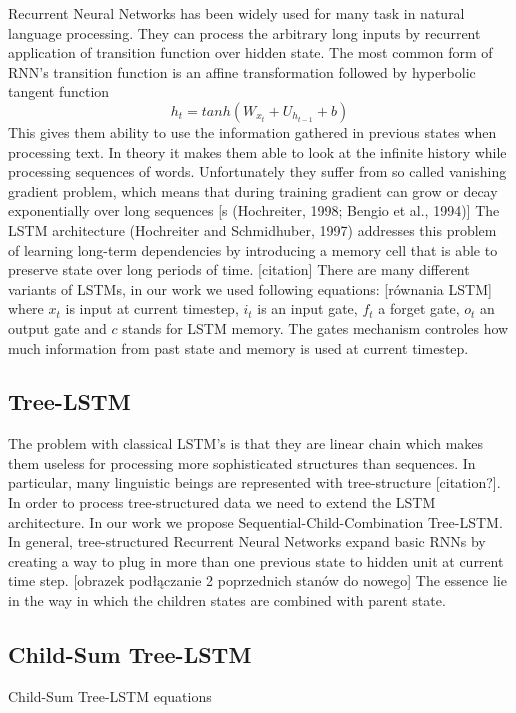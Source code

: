 \documentclass[10pt, a4paper]{article}
\begin{document}
Recurrent Neural Networks has been widely used for many task in natural language processing. They can process the arbitrary long inputs by recurrent application of transition function over hidden state. 
	The most common form of RNN's transition function is an affine transformation followed by hyperbolic tangent function
	\begin{equation} h_t = tanh(W_{x_t}+U_{h_{t-1}}+b)
\end{equation}
	  	This gives them ability to use the information gathered in previous states when processing text. In theory it makes them able to look at the infinite history while processing sequences of words. 	Unfortunately they suffer from so called vanishing gradient problem, which means that during training gradient can grow or decay exponentially over long sequences [s (Hochreiter,
1998; Bengio et al., 1994)]
	The LSTM architecture (Hochreiter and Schmidhuber, 1997) addresses this problem of learning long-term dependencies by introducing a memory cell that is able to preserve state over long periods of time. [citation]
		There are many different variants of LSTMs, in our work we used following equations:
		[równania LSTM]		
		where $x_t$ is input at current timestep, $i_t$ is an input gate, $f_t$ a forget gate, $o_t$ an output gate and $c$ stands for LSTM memory.
		The gates mechanism controles how much information from past state and memory is used at current timestep. 

\subsection{Tree-LSTM}
	The problem with classical LSTM's is that they are linear chain which makes them useless for processing more sophisticated structures than sequences. In particular, many linguistic beings are represented with tree-structure [citation?].
	In order to process tree-structured data we need to extend the LSTM architecture. In our work we propose Sequential-Child-Combination Tree-LSTM.
	In general, tree-structured Recurrent Neural Networks expand basic RNNs by creating a way to plug in more than one previous state to hidden unit at current time step.
	[obrazek podłączanie 2 poprzednich stanów do nowego]
	The essence lie in the way in which the children states are combined with parent state.

\subsection{Child-Sum Tree-LSTM}
        Child-Sum Tree-LSTM equations
	
\end{document}
